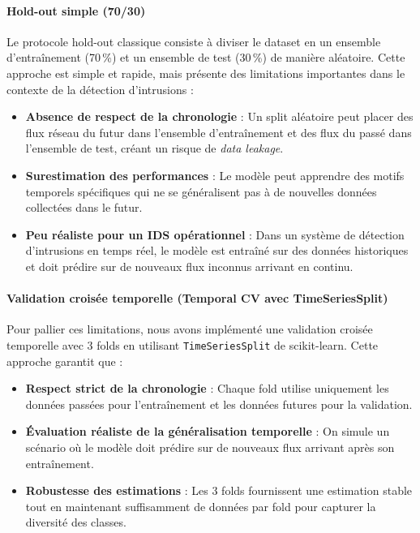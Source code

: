 ﻿\documentclass[11pt,a4paper]{article}
\begin{document}
\paragraph{Hold-out simple (70/30)}
Le protocole hold-out classique consiste à diviser le dataset en un ensemble d'entraînement (70\,\%) et un ensemble de test (30\,\%) de manière aléatoire. Cette approche est simple et rapide, mais présente des limitations importantes dans le contexte de la détection d'intrusions :
\begin{itemize}
    \item \textbf{Absence de respect de la chronologie} : Un split aléatoire peut placer des flux réseau du futur dans l'ensemble d'entraînement et des flux du passé dans l'ensemble de test, créant un risque de \emph{data leakage}.
    \item \textbf{Surestimation des performances} : Le modèle peut apprendre des motifs temporels spécifiques qui ne se généralisent pas à de nouvelles données collectées dans le futur.
    \item \textbf{Peu réaliste pour un IDS opérationnel} : Dans un système de détection d'intrusions en temps réel, le modèle est entraîné sur des données historiques et doit prédire sur de nouveaux flux inconnus arrivant en continu.
\end{itemize}

\paragraph{Validation croisée temporelle (Temporal CV avec TimeSeriesSplit)}
Pour pallier ces limitations, nous avons implémenté une validation croisée temporelle avec 3 folds en utilisant \texttt{TimeSeriesSplit} de scikit-learn. Cette approche garantit que :
\begin{itemize}
    \item \textbf{Respect strict de la chronologie} : Chaque fold utilise uniquement les données passées pour l'entraînement et les données futures pour la validation.
    \item \textbf{Évaluation réaliste de la généralisation temporelle} : On simule un scénario où le modèle doit prédire sur de nouveaux flux arrivant après son entraînement.
    \item \textbf{Robustesse des estimations} : Les 3 folds fournissent une estimation stable tout en maintenant suffisamment de données par fold pour capturer la diversité des classes.
\end{itemize}
\end{document}
